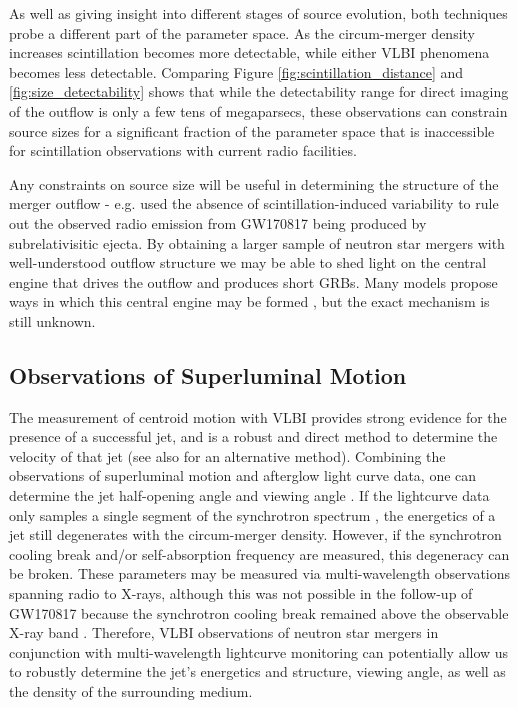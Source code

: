 As well as giving insight into different stages of source evolution, both techniques probe a different part of the parameter space. As the circum-merger density increases scintillation becomes more detectable, while either VLBI phenomena becomes less detectable. Comparing Figure \ref{fig:scintillation_distance} and \ref{fig:size_detectability} shows that while the detectability range for direct imaging of the outflow is only a few tens of megaparsecs, these observations can constrain source sizes for a significant fraction of the parameter space that is inaccessible for scintillation observations with current radio facilities.

Any constraints on source size will be useful in determining the structure of the merger outflow - e.g. \citet{2017Sci...358.1579H} used the absence of scintillation-induced variability to rule out the observed radio emission from GW170817 being produced by subrelativisitic ejecta. By obtaining a larger sample of neutron star mergers with well-understood outflow structure we may be able to shed light on the central engine that drives the outflow and produces short GRBs. Many models propose ways in which this central engine may be formed \citep[e.g. see][and references therein]{2019EPJA...55..132F}, but the exact mechanism is still unknown.


\subsection{Observations of Superluminal Motion} 
The measurement of centroid motion with VLBI provides strong evidence for the presence of a successful jet, and is a robust and direct method to determine the velocity of that jet (see also \citealt{2019MNRAS.483..624L} for an alternative method). Combining the observations of superluminal motion and afterglow light curve data, one can determine the jet half-opening angle and viewing angle \citep{2018Natur.561..355M,2019NatAs...3..940H}. If the lightcurve data only samples a single segment of the synchrotron spectrum \citep{1998ApJ...497L..17S}, the energetics of a jet still degenerates with the circum-merger density. However, if the synchrotron cooling break and/or self-absorption frequency are measured, this degeneracy can be broken. These parameters may be measured via multi-wavelength observations spanning radio to X-rays, although this was not possible in the follow-up of GW170817 because the synchrotron cooling break remained above the observable X-ray band \citep{2018ApJ...863L..18A}. Therefore, VLBI observations of neutron star mergers in conjunction with multi-wavelength lightcurve monitoring can potentially allow us to robustly determine the jet's energetics and structure, viewing angle, as well as the density of the surrounding medium.



